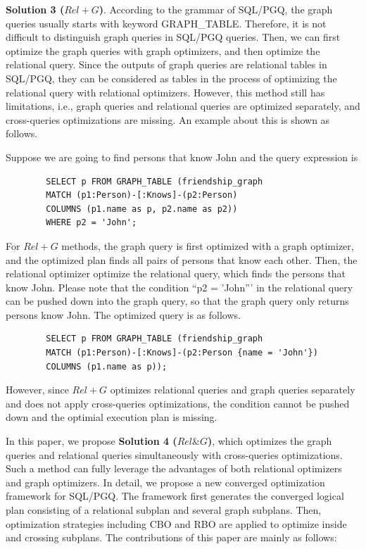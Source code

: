 \textbf{Solution 3 ($Rel+G$)}.
According to the grammar of SQL/PGQ, the graph queries usually starts with keyword GRAPH\_TABLE.
Therefore, it is not difficult to distinguish graph queries in SQL/PGQ queries.
Then, we can first optimize the graph queries with graph optimizers, and then optimize the relational query.
Since the outputs of graph queries are relational tables in SQL/PGQ, they can be considered as tables in the process of optimizing the relational query with relational optimizers.
However, this method still has limitations, i.e., graph queries and relational queries are optimized separately, and cross-queries optimizations are missing.
An example about this is shown as follows.

\begin{example}
    \label{example:push_down}
    Suppose we are going to find persons that know John and the query expression is
    \begin{lstlisting}
        SELECT p FROM GRAPH_TABLE (friendship_graph 
        MATCH (p1:Person)-[:Knows]-(p2:Person)
        COLUMNS (p1.name as p, p2.name as p2))
        WHERE p2 = 'John';
    \end{lstlisting}
    For $Rel+G$ methods, the graph query is first optimized with a graph optimizer, and the optimized plan finds all pairs of persons that know each other.
    Then, the relational optimizer optimize the relational query, which finds the persons that know John.
    Please note that the condition ``p2 = 'John''' in the relational query can be pushed down into the graph query, so that the graph query only returns persons know John.
    The optimized query is as follows.
    \begin{lstlisting}
        SELECT p FROM GRAPH_TABLE (friendship_graph 
        MATCH (p1:Person)-[:Knows]-(p2:Person {name = 'John'})
        COLUMNS (p1.name as p));
    \end{lstlisting}
    However, since $Rel+G$ optimizes relational queries and graph queries separately and does not apply cross-queries optimizations, the condition cannot be pushed down and the optimial execution plan is missing.
\end{example}

In this paper, we propose \textbf{Solution 4 ($Rel\&G$)}, which optimizes the graph queries and relational queries simultaneously with cross-queries optimizations.
Such a method can fully leverage the advantages of both relational optimizers and graph optimizers.
In detail, we propose a new converged optimization framework for SQL/PGQ.
The framework first generates the converged logical plan consisting of a relational subplan and several graph subplans.
Then, optimization strategies including CBO and RBO are applied to optimize inside and crossing subplans.
The contributions of this paper are mainly as follows:

